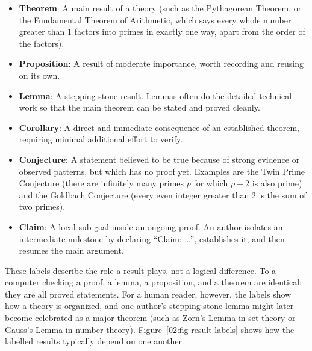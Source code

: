 \begin{itemize}
\item \textbf{Theorem}: A main result of a theory (such as the Pythagorean Theorem, or the Fundamental Theorem of Arithmetic, which says every whole number greater than $1$ factors into primes in exactly one way, apart from the order of the factors).
\item \textbf{Proposition}: A result of moderate importance, worth recording and reusing on its own.
\item \textbf{Lemma}: A stepping-stone result. Lemmas often do the detailed technical work so that the main theorem can be stated and proved cleanly.
\item \textbf{Corollary}: A direct and immediate consequence of an established theorem, requiring minimal additional effort to verify.
\item \textbf{Conjecture}: A statement believed to be true because of strong evidence or observed patterns, but which has no proof yet. Examples are the Twin Prime Conjecture (there are infinitely many primes $p$ for which $p + 2$ is also prime) and the Goldbach Conjecture (every even integer greater than $2$ is the sum of two primes).
\item \textbf{Claim}: A local sub-goal inside an ongoing proof. An author isolates an intermediate milestone by declaring ``Claim: \ldots'', establishes it, and then resumes the main argument.
\end{itemize}

These labels describe the role a result plays, not a logical difference. To a computer checking a proof, a lemma, a proposition, and a theorem are identical: they are all proved statements. For a human reader, however, the labels show how a theory is organized, and one author's stepping-stone lemma might later become celebrated as a major theorem (such as Zorn's Lemma in set theory or Gauss's Lemma in number theory). Figure~\ref{02:fig-result-labels} shows how the labelled results typically depend on one another.

